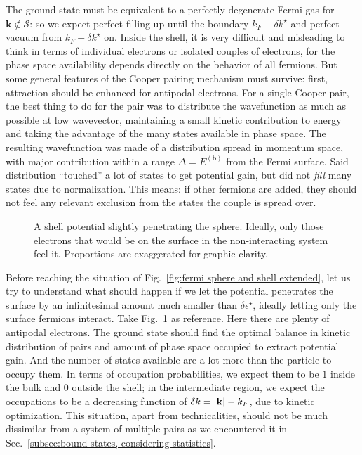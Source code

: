 The ground state must be equivalent to a perfectly degenerate Fermi gas for $\mathbf{k} \not\in \mathcal{S}$: so we expect perfect filling up until the boundary $k_F - \delta k^\star$ and perfect vacuum from $k_F + \delta k^\star$ on. Inside the shell, it is very difficult and misleading to think in terms of individual electrons or isolated couples of electrons, for the phase space availability depends directly on the behavior of all fermions. But some general features of the Cooper pairing mechanism must survive: first, attraction should be enhanced for antipodal electrons. For a single Cooper pair, the best thing to do for the pair was to distribute the wavefunction as much as possible at low wavevector, maintaining a small kinetic contribution to energy and taking the advantage of the many states available in phase space. The resulting wavefunction was made of a distribution spread in momentum space, with major contribution within a range $\Delta = E^{(\mathrm{b})}$ from the Fermi surface. Said distribution ``touched'' a lot of states to get potential gain, but did not \textit{fill} many states due to normalization. This means: if other fermions are added, they should not feel any relevant exclusion from the states the couple is spread over.

\begin{figure}
	\centering
	
	\caption{A shell potential slightly penetrating the sphere. Ideally, only those electrons that would be on the surface in the non-interacting system feel it. Proportions are exaggerated for graphic clarity.}
	\label{fig:fermi sphere and shell extended first onion}
\end{figure}

Before reaching the situation of Fig.~\ref{fig:fermi sphere and shell extended}, let us try to understand what should happen if we let the potential penetrates the surface by an infinitesimal amount much smaller than $\delta\epsilon^\star$, ideally letting only the surface fermions interact. Take Fig.~\ref{fig:fermi sphere and shell extended first onion} as reference. Here there are plenty of antipodal electrons. The ground state should find the optimal balance in kinetic distribution of pairs and amount of phase space occupied to extract potential gain. And the number of states available are a lot more than the particle to occupy them.
In terms of occupation probabilities, we expect them to be $1$ inside the bulk and $0$ outside the shell; in the intermediate region, we expect the occupations to be a decreasing function of $\delta k = \abs{\mathbf{k}} - k_F$, due to kinetic optimization. This situation, apart from technicalities, should not be much dissimilar from a system of multiple pairs as we encountered it in Sec.~\ref{subsec:bound states, considering statistics}.

